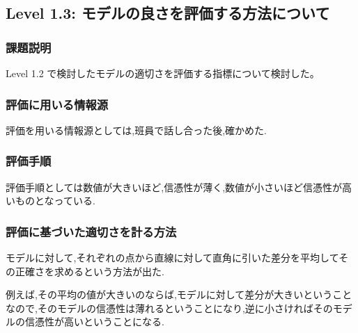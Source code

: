 \subsection{Level 1.3: モデルの良さを評価する方法について}
\subsubsection{課題説明}
Level 1.2 で検討したモデルの適切さを評価する指標について検討した。

\subsubsection{評価に用いる情報源}
評価を用いる情報源としては,班員で話し合った後,確かめた.
\subsubsection{評価手順}
評価手順としては数値が大きいほど,信憑性が薄く,数値が小さいほど信憑性が高いものとなっている.
\subsubsection{評価に基づいた適切さを計る方法}
モデルに対して,それぞれの点から直線に対して直角に引いた差分を平均してその正確さを求めるという方法が出た.

例えば,その平均の値が大きいのならば,モデルに対して差分が大きいということなので,そのモデルの信憑性は薄れるということになり,逆に小さければそのモデルの信憑性が高いということになる.

